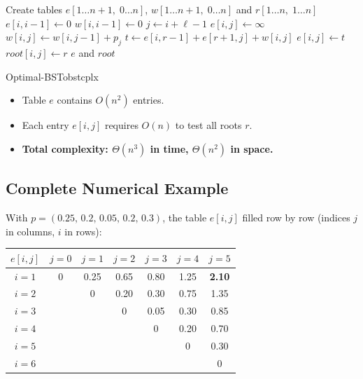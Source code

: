 \begin{algorithm}[H]
\caption{Optimal-BST($p$, $n$)}
\begin{algorithmic}[1]
\State Create tables $e[1\ldots n+1,\; 0\ldots n]$,
       $w[1\ldots n+1,\; 0\ldots n]$ and $r[1\ldots n,\; 1\ldots n]$
    \State $e[i, i-1] \leftarrow 0$     
    \State $w[i, i-1] \leftarrow 0$
\EndFor
{}        
        \State $j \leftarrow i + \ell - 1$
        \State $e[i,j] \leftarrow \infty$
        \State $w[i,j] \leftarrow w[i, j-1] + p_j$
           
            \State $t \leftarrow e[i, r-1] + e[r+1, j] + w[i,j]$
                \State $e[i,j] \leftarrow t$
                \State $\mathit{root}[i,j] \leftarrow r$  
            \EndIf
        \EndFor
    \EndFor
\EndFor
\State \Return $e$ and $\mathit{root}$
\end{algorithmic}
\end{algorithm}

\begin{complexity}{Optimal-BST}{obstcplx}
\begin{itemize}[noitemsep]
  \item Table $e$ contains $O(n^2)$ entries.
  \item Each entry $e[i,j]$ requires $O(n)$ to test all roots $r$.
  \item \textbf{Total complexity: $\Theta(n^3)$ in time, $\Theta(n^2)$ in space.}
\end{itemize}
\end{complexity}

\subsection{Complete Numerical Example}

With $p = (0.25,\, 0.2,\, 0.05,\, 0.2,\, 0.3)$, the table $e[i,j]$ filled
row by row (indices $j$ in columns, $i$ in rows):

\begin{center}
\renewcommand{\arraystretch}{1.5}
\begin{tabular}{c|cccccc}
\toprule
$e[i,j]$ & $j=0$ & $j=1$ & $j=2$ & $j=3$ & $j=4$ & $j=5$ \\
\midrule
$i=1$ & 0 & 0.25 & 0.65 & 0.80 & 1.25 & \cellcolor{blue!20}\textbf{2.10} \\
$i=2$ &   & 0    & 0.20 & 0.30 & 0.75 & 1.35 \\
$i=3$ &   &      & 0    & 0.05 & 0.30 & 0.85 \\
$i=4$ &   &      &      & 0    & 0.20 & 0.70 \\
$i=5$ &   &      &      &      & 0    & 0.30 \\
$i=6$ &   &      &      &      &      & 0    \\
\bottomrule
\end{tabular}
\end{center}

